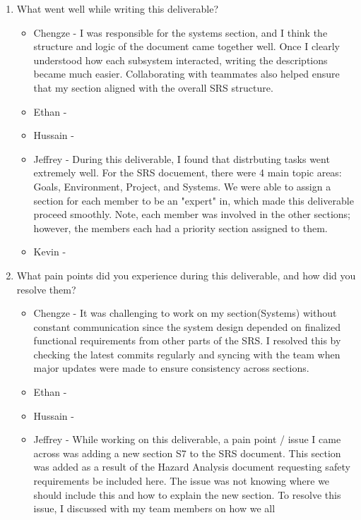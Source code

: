 \begin{enumerate}
  \item What went well while writing this deliverable?
  \begin{itemize}
        \item Chengze - I was responsible for the systems section, and 
        I think the structure and logic of the document came together 
        well. Once I clearly understood how each subsystem interacted, 
        writing the descriptions became much easier. Collaborating with 
        teammates also helped ensure that my section aligned with the 
        overall SRS structure.
        \item Ethan - 
        \item Hussain - 
        \item Jeffrey - During this deliverable, I found that distrbuting tasks
        went extremely well. For the SRS docuement, there were 4 main topic areas:
        Goals, Environment, Project, and Systems. We were able to assign a 
        section for each member to be an "expert" in, which made this 
        deliverable proceed smoothly. Note, each member was involved in the 
        other sections; however, the members each had a priority section assigned 
        to them. 
        \item Kevin - 
  \end{itemize} 
  \item What pain points did you experience during this deliverable, and how did
  you resolve them?
  \begin{itemize}
        \item Chengze - It was challenging to work on my section(Systems) without 
        constant communication since the system design depended on finalized 
        functional requirements from other parts of the SRS. I resolved this 
        by checking the latest commits regularly and syncing with the team when 
        major updates were made to ensure consistency across sections.
        \item Ethan - 
        \item Hussain - 
        \item Jeffrey - While working on this deliverable, a pain point / issue
        I came across was adding a new section S7 to the SRS document. This
        section was added as a result of the Hazard Analysis document requesting
        safety requirements be included here. The issue was not knowing
        where we should include this and how to explain the new section.
        To resolve this issue, I discussed with my team members on how we all

\end{itemize}
\end{enumerate}
